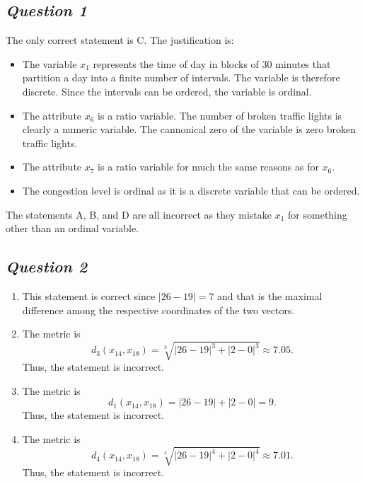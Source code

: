 \documentclass[twoside,11pt]{article}
\makeatletter
\let\@oldsubsection\subsection
\renewcommand\subsection[1]{\@oldsubsection*{\textit{#1}}}
\makeatother
\begin{document}
\subsection{Question 1}

The only correct statement is C. The justification is:

\begin{itemize}
\item
  The variable \(x_1\) represents the time of day in blocks of 30
  minutes that partition a day into a finite number of intervals. The
  variable is therefore discrete. Since the intervals can be ordered,
  the variable is ordinal.
\item
  The attribute \(x_6\) is a ratio variable. The number of broken
  traffic lights is clearly a numeric variable. The cannonical zero of
  the variable is zero broken traffic lights.
\item
  The attribute \(x_7\) is a ratio variable for much the same reasons as
  for \(x_6\).
\item
  The congestion level is ordinal as it is a discrete variable that can
  be ordered.
\end{itemize}

The statements A, B, and D are all incorrect as they mistake \(x_1\) for something other than an ordinal variable.

\subsection{Question 2}

\begin{enumerate}[label=\Alph*.]
	\item This statement is correct since \(|26 - 19| = 7\) and that is the maximal difference among the respective coordinates of the two vectors.

	\item The metric is
	\[
		d_3(x_{14}, x_{18}) = \sqrt[3]{|26 - 19|^3 + |2 - 0|^3} \approx 7.05.
	\]
	Thus, the statement is incorrect.

	\item The metric is
	\[
		d_1(x_{14}, x_{18}) = |26 - 19| + |2 - 0| = 9.
	\]
	Thus, the statement is incorrect.

	\item The metric is
	\[
		d_4(x_{14}, x_{18}) = \sqrt[4]{|26 - 19|^4 + |2 - 0|^4} \approx 7.01.
	\]
	Thus, the statement is incorrect.

\end{enumerate}
\end{document}
